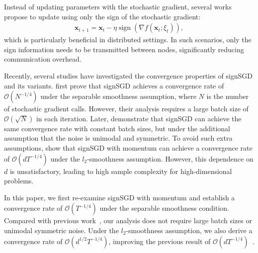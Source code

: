 \documentclass{article}
\def \x {\mathbf{x}}
\def \x {\mathbf{x}}
\begin{document}
Instead of updating parameters with the stochastic gradient, several works~\citep{pmlr-v80-bernstein18a,bernstein2018signsgd,pmlr-v139-safaryan21a} propose to update using only the sign of the stochastic gradient:  
\begin{align}\label{signsgd}
    \x_{t+1} = \x_t - \eta \operatorname{sign}\left(\nabla f(\x_t;\xi_t)\right),
\end{align}
which is particularly beneficial in distributed settings. In such scenarios, only the sign information needs to be transmitted between nodes, significantly reducing communication overhead.

Recently, several studies have investigated the convergence properties of signSGD and its variants. \cite{pmlr-v80-bernstein18a} first prove that signSGD achieves a convergence rate of $\mathcal{O}(N^{-1/4})$ under the separable smoothness assumption, where $N$ is the number of stochastic gradient calls. However, their analysis requires a large batch size of $\mathcal{O}(\sqrt{N})$ in each iteration.
Later, \cite{bernstein2018signsgd} demonstrate that signSGD can achieve the same convergence rate with constant batch sizes, but under the additional assumption that the noise is unimodal and symmetric.
To avoid such extra assumptions, \cite{pmlr-v202-sun23l} show that signSGD with momentum can achieve a convergence rate of $\mathcal{O}(dT^ {-1/4})$ under the $l_2$-smoothness assumption. However, this dependence on $d$ is unsatisfactory, leading to high sample complexity for high-dimensional problems.

In this paper, we first re-examine signSGD with momentum and establish a convergence rate of $\mathcal{O}(T^{-1/4})$ under the separable smoothness condition. Compared with previous work~\citep{pmlr-v80-bernstein18a,bernstein2018signsgd}, our analysis does not require large batch sizes or unimodal symmetric noise. Under the $l_2$-smoothness assumption, we also derive a convergence rate of $\mathcal{O}(d^{1/2} T^{-1/4})$, improving the previous result of $\mathcal{O}(d T^{-1/4})$~\citep{pmlr-v202-sun23l}.
\end{document}
